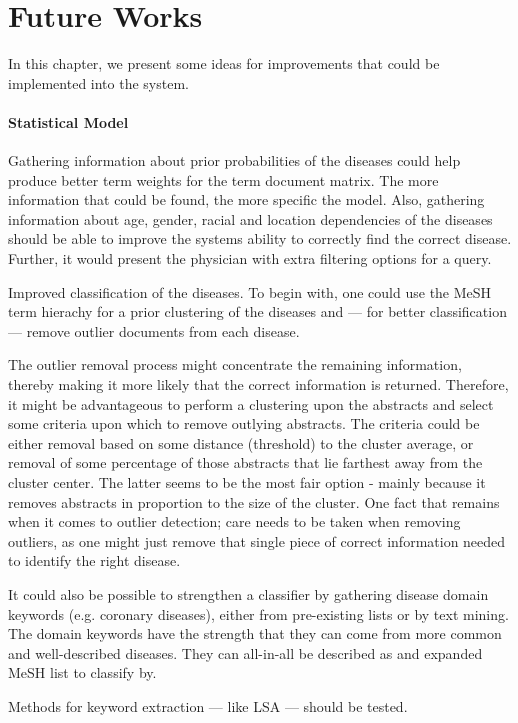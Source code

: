 \chapter{Future Works\label{FutureWorks}}

In this chapter, we present some ideas for improvements that 
could be implemented into the system.

\subsubsection{Statistical Model}
Gathering information about prior probabilities of the diseases could
help produce better term weights for the term document matrix. The
more information that could be found, the more specific the
model. Also, gathering information about age, gender, racial and location
dependencies of the diseases should be able to improve the systems
ability to correctly find the correct disease. Further, it would present
the physician with extra filtering options for a query.

Improved classification of the diseases. To begin with, one could use 
the MeSH term hierachy for a prior clustering of the diseases and --- for
better classification --- remove outlier documents from each disease.

The outlier removal process might concentrate the remaining information, 
thereby making it more likely that the correct information is returned. 
Therefore, it might be advantageous to perform a clustering upon the
abstracts and select some criteria upon which to remove outlying abstracts.
The criteria could be either removal based on some distance (threshold) 
to the cluster average, or removal of some percentage of those abstracts
that lie farthest away from the cluster center. The latter seems to be 
the most fair option - mainly because it removes abstracts in proportion to 
the size of the cluster. One fact that remains when it comes to outlier 
detection; care needs to be taken when removing outliers, as one might just 
remove that single piece of correct information needed to identify the right disease.

It could also be possible to strengthen a classifier by gathering disease
domain keywords (e.g. coronary diseases), either from pre-existing lists or by text 
mining. The domain keywords have the strength that they can come from
more common and well-described diseases. They can all-in-all be described as
and expanded MeSH list to classify by.

Methods for keyword extraction --- like LSA --- should be tested.

